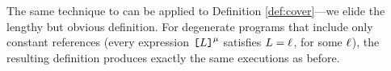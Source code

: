   The same technique to can be applied to Definition \ref{def:cover}---we
  elide the lengthy but obvious definition. For degenerate programs that include only
  constant references (every expression $\texttt{[}L\texttt{]}^\mu$ satisfies
  $L=\ell$, for some $\ell$), the resulting definition produces exactly
  the same executions as before.


